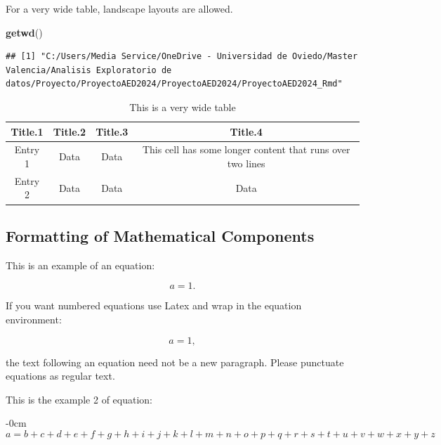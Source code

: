 \documentclass[notspecified,article,submit,moreauthors,pdftex]{Definitions/mdpi}
\newenvironment{Shaded}{\begin{snugshade}}{\end{snugshade}}
\newcommand{\FunctionTok}[1]{\textcolor[rgb]{0.13,0.29,0.53}{\textbf{#1}}}
\newcommand{\NormalTok}[1]{#1}
\begin{document}
For a very wide table, landscape layouts are allowed.

\begin{Shaded}
\begin{Highlighting}[]
\FunctionTok{getwd}\NormalTok{()}
\end{Highlighting}
\end{Shaded}

\begin{verbatim}
## [1] "C:/Users/Media Service/OneDrive - Universidad de Oviedo/Master Valencia/Analisis Exploratorio de datos/Proyecto/ProyectoAED2024/ProyectoAED2024/ProyectoAED2024_Rmd"
\end{verbatim}

\startlandscape

\begin{table}[H]

\caption{\label{tab:tab2}This is a very wide table}
\begin{tabular}[t]{cccc}
\toprule
Title.1 & Title.2 & Title.3 & Title.4\\
\midrule
Entry 1 & Data & Data & This cell has some longer content that runs over
                               two lines\\
Entry 2 & Data & Data & Data\\
\bottomrule
\end{tabular}
\end{table}

\finishlandscape

\subsection{Formatting of Mathematical
Components}\label{formatting-of-mathematical-components}

This is an example of an equation:

\[
a = 1.
\]

If you want numbered equations use Latex and wrap in the equation
environment:

\begin{equation}
a = 1,
\end{equation}

the text following an equation need not be a new paragraph. Please
punctuate equations as regular text.

This is the example 2 of equation:

\begin{adjustwidth}{-\extralength}{0cm}
\begin{equation}
a = b + c + d + e + f + g + h + i + j + k + l + m + n + o + p + q + r + s + t + 
u + v + w + x + y + z
\end{equation}
\end{adjustwidth}
\end{document}
